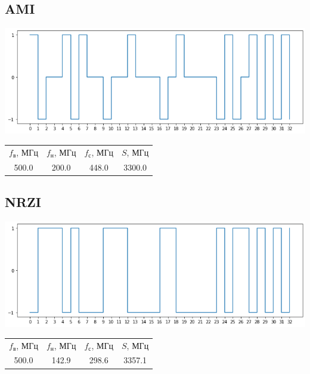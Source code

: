 \subsection{AMI}
\includegraphics[width=\textwidth]{2ami}
\begin{center}
    \begin{tabular}{cccc}
        $f_\mathrm{\text{в}}$, МГц & $f_\mathrm{\text{н}}$, МГц & $f_\mathrm{\text{с}}$, МГц & $S$, МГц \\
        500.0 & 200.0 & 448.0 & 3300.0 \\
    \end{tabular}
\end{center}

\subsection{NRZI}
\includegraphics[width=\textwidth]{2nrzi}
\begin{center}
    \begin{tabular}{cccc}
        $f_\mathrm{\text{в}}$, МГц & $f_\mathrm{\text{н}}$, МГц & $f_\mathrm{\text{с}}$, МГц & $S$, МГц \\
        500.0 & 142.9 & 298.6 & 3357.1 \\
    \end{tabular}
\end{center}

